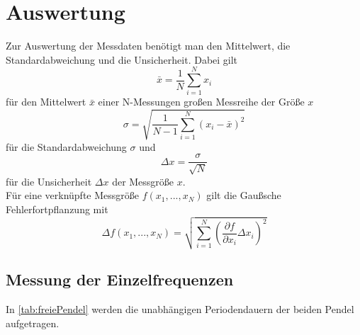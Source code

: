 \section{Auswertung}
\label{sec:Auswertung}
Zur Auswertung der Messdaten benötigt man den Mittelwert, die Standardabweichung und die Unsicherheit. Dabei gilt
\begin{equation}
  \bar{x}=\dfrac{1}{N}\sum_{i=1}^N x_i
  \label{eq:mean}
\end{equation}
für den Mittelwert $\bar{x}$ einer N-Messungen großen Messreihe der Größe $x$
\begin{equation}
σ=\sqrt{\dfrac{1}{N-1}\sum_{i=1}^N(x_i-\bar{x})^2} 
\label{eq:std} 
\end{equation}
für die Standardabweichung $σ$ und
\begin{equation}
  Δx=\dfrac{σ}{\sqrt{N}}
  \label{eq:unc} 
\end{equation}
für die Unsicherheit $Δx$ der Messgröße $x$. \\

Für eine verknüpfte Messgröße $f(x_1,...,x_N)$ gilt die Gaußsche Fehlerfortpflanzung mit
\begin{equation}
Δf(x_1,...,x_N)=\sqrt{\sum_{i=1}^N (\frac{\partial f}{\partial x_i}Δx_i)^2}
\label{eq:gaussF}
\end{equation}

\newpage


\subsection{Messung der Einzelfrequenzen}
In \autoref{tab:freiePendel} werden die unabhängigen Periodendauern der beiden Pendel aufgetragen.

